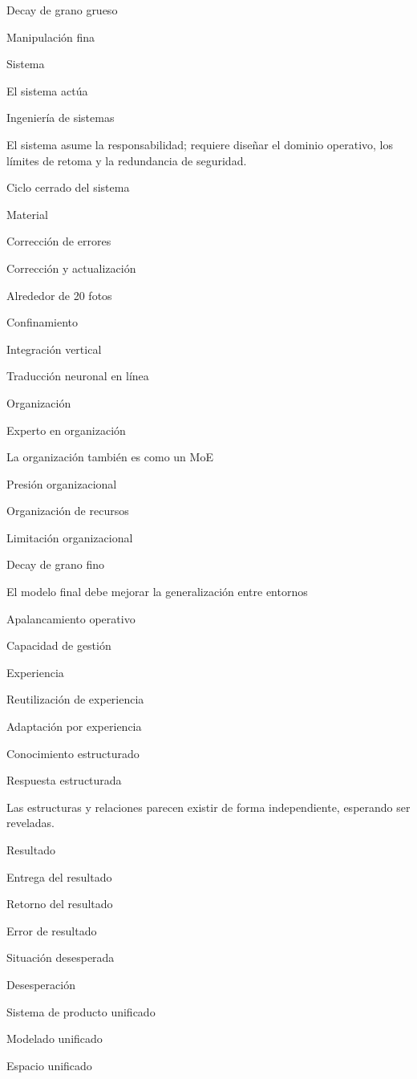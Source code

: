 \documentclass{article}
\begin{document}
Decay de grano grueso

Manipulación fina

Sistema

El sistema actúa

Ingeniería de sistemas

El sistema asume la responsabilidad; requiere diseñar el dominio operativo, los límites de retoma y la redundancia de seguridad.

Ciclo cerrado del sistema

Material

Corrección de errores

Corrección y actualización

Alrededor de 20 fotos

Confinamiento

Integración vertical

Traducción neuronal en línea

Organización

Experto en organización

La organización también es como un MoE

Presión organizacional

Organización de recursos

Limitación organizacional

Decay de grano fino

El modelo final debe mejorar la generalización entre entornos

Apalancamiento operativo

Capacidad de gestión

Experiencia

Reutilización de experiencia

Adaptación por experiencia

Conocimiento estructurado

Respuesta estructurada

Las estructuras y relaciones parecen existir de forma independiente, esperando ser reveladas.

Resultado

Entrega del resultado

Retorno del resultado

Error de resultado

Situación desesperada

Desesperación

Sistema de producto unificado

Modelado unificado

Espacio unificado
\end{document}
